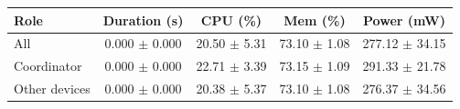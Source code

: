 \begin{tabular}{lcccc}
\hline
\textbf{Role} & \textbf{Duration (s)} & \textbf{CPU (\%)} & \textbf{Mem (\%)} & \textbf{Power (mW)} \\
\hline
All & 0.000 $\pm$ 0.000 & 20.50 $\pm$ 5.31 & 73.10 $\pm$ 1.08 & 277.12 $\pm$ 34.15 \\
Coordinator & 0.000 $\pm$ 0.000 & 22.71 $\pm$ 3.39 & 73.15 $\pm$ 1.09 & 291.33 $\pm$ 21.78 \\
Other devices & 0.000 $\pm$ 0.000 & 20.38 $\pm$ 5.37 & 73.10 $\pm$ 1.08 & 276.37 $\pm$ 34.56 \\
\hline
\end{tabular}
